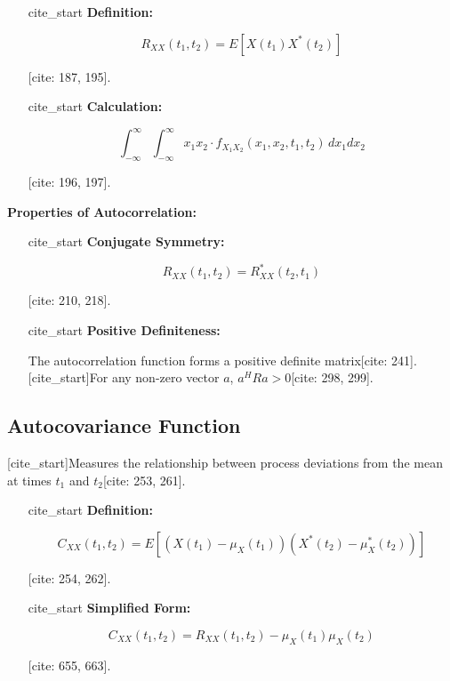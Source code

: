\documentclass{article}
\begin{document}
\begin{itemize}

\item [cite\_start]\textbf{Definition:}

\[
R_{XX}(t_1, t_2) = E[X(t_1)X^*(t_2)]
\]

[cite: 187, 195].

\item [cite\_start]\textbf{Calculation:}

\[
\int_{-\infty}^{\infty}
\int_{-\infty}^{\infty}
x_1 x_2
\cdot
f_{X_1X_2}(x_1, x_2, t_1, t_2)
\, dx_1 dx_2
\]

[cite: 196, 197].

\end{itemize}

\textbf{Properties of Autocorrelation:}

\begin{enumerate}

\item [cite\_start]\textbf{Conjugate Symmetry:}

\[
R_{XX}(t_1, t_2) = R_{XX}^*(t_2, t_1)
\]

[cite: 210, 218].

\item [cite\_start]\textbf{Positive Definiteness:}

The autocorrelation function forms a positive definite matrix[cite: 241]. [cite\_start]For any non-zero vector $a$, $a^H Ra > 0$[cite: 298, 299].

\end{enumerate}

\subsection{Autocovariance Function}

[cite\_start]Measures the relationship between process deviations from the mean at times $t_1$ and $t_2$[cite: 253, 261].

\begin{itemize}

\item [cite\_start]\textbf{Definition:}

\[
C_{XX}(t_1, t_2)
=
E[
(X(t_1) - \mu_X(t_1))
(X^*(t_2) - \mu_X^*(t_2))
]
\]

[cite: 254, 262].

\item [cite\_start]\textbf{Simplified Form:}

\[
C_{XX}(t_1, t_2)
=
R_{XX}(t_1, t_2)
-
\mu_X(t_1)\mu_X(t_2)
\]

[cite: 655, 663].

\end{itemize}
\end{document}
